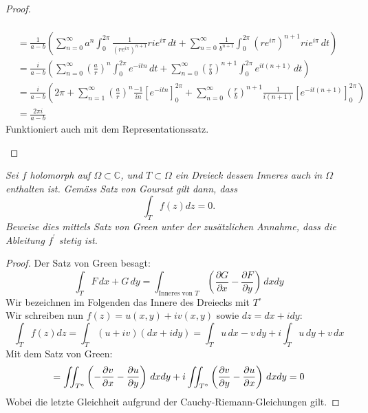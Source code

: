 \documentclass[11pt]{article}
\newenvironment{problem}[2][Beispiel]{
    \begin{trivlist}
        \item[\hskip \labelsep {\bfseries #1}\hskip \labelsep {\bfseries #2.}] \itshape}{
    \end{trivlist}\normalshape
}
\begin{document}
\begin{proof}
\begin{enumerate}[label = (\alph*)]
$$\begin{aligned}
                  \\&= \frac{1}{a-b}\left(\sum_{n=0}^\infty a^n \int_0^{2\pi} \frac{1}{(re^{i\pi})^{n+1}} rie^{i\pi}\,dt+
                  \sum_{n=0}^\infty\frac{1}{b^{n+1}}\int_0^{2\pi} (re^{i\pi})^{n+1} rie^{i\pi}\,dt\right)
                  \\&= \frac{i}{a-b}\left(\sum_{n=0}^\infty \left(\frac{a}{r}\right)^n \int_0^{2\pi}
                  e^{-itn} \,dt+\sum_{n=0}^\infty\left(\frac{r}{b}\right)^{n+1}\int_0^{2\pi}e^{it(n+1)} \,dt\right)
                  \\&= \frac{i}{a-b}\left(2\pi+ \sum_{n=1}^\infty \left(\frac{a}{r}\right)^n \frac{-1}{in}
                  [e^{-itn}]_0^{2\pi}+\sum_{n=0}^\infty\left(\frac{r}{b}\right)^{n+1}\frac{1}{i(n+1)}
                  [e^{-it(n+1)}]_0^{2\pi}\right)
                  \\&= \frac{2\pi i}{a-b}
            \end{aligned}$$
            Funktioniert auch mit dem Representationssatz.
        \end{enumerate}
    \end{proof}

    \begin{problem}{5}
        Sei $f$ holomorph auf $\Omega \subset \mathbb{C}$, und $T \subset \Omega$ ein Dreieck dessen
        Inneres auch in $\Omega$ enthalten ist. Gemäss Satz von Goursat gilt dann, dass
        $$
        \int_T f(z) d z=0 .
        $$
        Beweise dies mittels Satz von Green unter der zusätzlichen Annahme, dass die Ableitung $f^{\prime}$
        stetig ist.
    \end{problem}

    \begin{proof}
        Der Satz von Green besagt:
        $$\int_T F\,dx +G\,dy = \int_{\text{Inneres von }T}
        \left(\frac{\partial G}{\partial x}-\frac{\partial F}{\partial y}\right)\,dxdy$$
        Wir bezeichnen im Folgenden das Innere des Dreiecks mit $T^\circ$\\
        Wir schreiben nun $f(z) = u(x,y)+i v(x,y)$ sowie $dz = dx + idy$:
        $$\int_T f(z) d z = \int_T (u+iv)(dx+idy) = \int_T u\,dx - v\,dy + i \int_T u\,dy+v\,dx$$
        Mit dem Satz von Green:
        $$ = \int\hspace{-5pt}\int_{T^\circ} \left(-\frac{\partial v}{\partial x}-
        \frac{\partial u}{\partial y}\right)\,dxdy+i\int\hspace{-5pt}\int_{T^\circ} \left(\frac{\partial v}
        {\partial y}-\frac{\partial u}{\partial x}\right)\,dxdy = 0$$
        Wobei die letzte Gleichheit aufgrund der Cauchy-Riemann-Gleichungen gilt.
    \end{proof}
\end{document}
